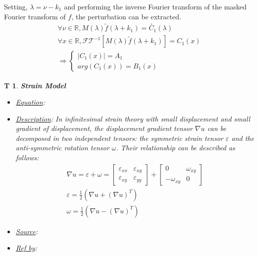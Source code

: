 \documentclass[12pt]{article}
\newtheorem{T}{T}
\begin{document}
Setting, $\lambda=\nu-k_1$ and performing the inverse Fourier transform of the masked Fourier transform of $f$, the perturbation can be extracted.
\begin{equation*}
\begin{gathered}
\forall \nu \in \mathbb{R}, M(\lambda)\widetilde{f}(\lambda+k_1)=\widetilde{C_1}(\lambda) \\
\forall x \in \mathbb{R}, \mathcal{FT}^{-1}[M(\lambda)\widetilde{f}(\lambda+k_1)]=C_1(x) \\
\Rightarrow \begin{cases}
|C_1(x)|=A_1 \\
arg(C_1(x))=B_1(x)
\end{cases}
\end{gathered}
\end{equation*}
\begin{T}
\normalfont \textbf{Strain Model}
\begin{itemize}
\item \underline{Equation}: 
\item \underline{Description}: In infinitesimal strain theory with small displacement and small gradient of displacement, the displacement gradient tensor $\nabla u$ can be decomposed in two independent tensors: the symmetric strain tensor $\varepsilon$ and the anti-symmetric rotation tensor $\omega$. Their relationship can be described as follows:
\begin{equation}
\begin{gathered}
\nabla u = \varepsilon + \omega = \begin{bmatrix}
	\varepsilon_{xx} & \varepsilon_{xy} \\
	\varepsilon_{xy} & \varepsilon_{yy} 
	\end{bmatrix} + \begin{bmatrix}
	0 & \omega_{xy} \\
	-\omega_{xy} & 0 
	\end{bmatrix} \\ 
\varepsilon = \frac{1}{2}(\nabla u+(\nabla u)^{T}) \\
\omega = \frac{1}{2}(\nabla u-(\nabla u)^{T})
\end{gathered}
\label{eq:strain_2}
\end{equation}
\item \underline{Source}:\cite{Hytch1998,Rouviere2005}
\item \underline{Ref by}:
\end{itemize}
\label{T_3}
\end{T}
\end{document}
